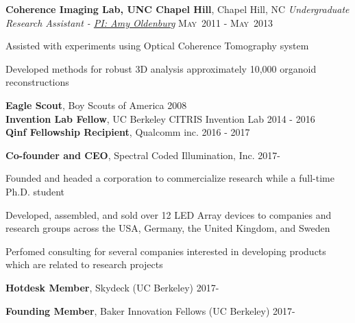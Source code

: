 \documentclass[12pt,letterpaper]{article}
\newenvironment{itemize*}%
{\begin{itemize}%
  \setlength{\itemsep}{0pt}}%
{\end{itemize}}
\newcommand{\ML}{\textsc{Matlab}}
\newcommand{\mhead}[1]{\leavevmode\marginpar{\sffamily\footnotesize #1}}
\newcommand{\rdate}[1]{{} \hfill #1}
\begin{document}
\smallskip
\textbf{Coherence Imaging Lab, \textbf{UNC Chapel Hill}}, Chapel Hill, NC \newline
\emph{Undergraduate Research Assistant - \href{http://user.physics.unc.edu/~aold/}{PI: Amy Oldenburg}} \rdate{\textsc{May}~2011 - \textsc{May}~2013}
\begin{itemize*}
   \item Assisted with experiments using Optical Coherence Tomography system
   \item Developed methods for robust 3D analysis approximately 10,000 organoid reconstructions
\end{itemize*}
\medskip
\mhead{Relevant Awards}%
\textbf{Eagle Scout}, Boy Scouts of America         			         \rdate{2008} \\
\textbf{Invention Lab Fellow}, UC Berkeley CITRIS Invention Lab		 \rdate{2014 - 2016} \\
\textbf{Qinf Fellowship Recipient}, Qualcomm inc.                  \rdate{2016 - 2017}

\medskip
%


\mhead{Startup \\Experience}
\textbf{Co-founder and CEO}, Spectral Coded Illumination, Inc. \rdate{2017-}
\begin{itemize*}
   \item Founded and headed a corporation to commercialize research while a full-time Ph.D. student
   \item Developed, assembled, and sold over 12 LED Array devices to companies and research groups across the USA, Germany, the United Kingdom, and Sweden
   \item Perfomed consulting for several companies interested in developing products which are related to research projects
\end{itemize*}
\textbf{Hotdesk Member}, Skydeck (UC Berkeley) \rdate{2017-}


\textbf{Founding Member}, Baker Innovation Fellows (UC Berkeley) \rdate{2017-}
\end{document}
